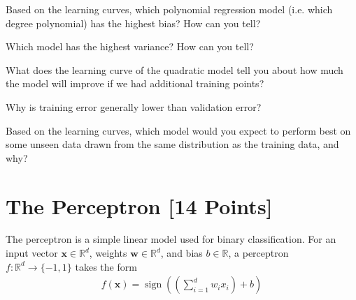 \begin{problem}[3]
  Based on the learning curves, which polynomial regression model (i.e. which degree polynomial) has the highest bias? How can you tell?
\end{problem}
\begin{solution}

\end{solution}

\begin{problem}[3]
  Which model has the highest variance? How can you tell?
\end{problem}
\begin{solution}
  
\end{solution}

\begin{problem}[3]
  What does the learning curve of the quadratic model tell you about how much the model will improve if we had additional training points?
\end{problem}
\begin{solution}

\end{solution}

\begin{problem}[3]
  Why is training error generally lower than validation error?
\end{problem}
\begin{solution}
  
\end{solution}

\begin{problem}[3]
  Based on the learning curves, which model would you expect to perform best on some unseen data drawn from the same distribution as the training data, and why?
\end{problem}
\begin{solution}
  
\end{solution}





\newpage
\section{The Perceptron [14 Points]}

The perceptron is a simple linear model used for binary classification. For an input vector $\mathbf{x} \in \mathbb{R}^d$, weights $\mathbf{w} \in \mathbb{R}^d$, and bias $b \in \mathbb{R}$, a perceptron $f: \mathbb{R}^d \rightarrow \{-1,1\}$ takes the form
\begin{align*}
  f(\mathbf{x}) = \operatorname{sign}\left(\left(\sum_{i=1}^d w_i x_i\right) + b \right)
\end{align*}

